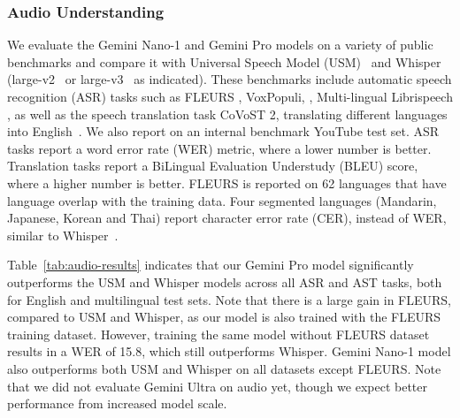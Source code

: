 \clearpage
\subsubsection{Audio Understanding}
\label{sec:audio}
We evaluate the Gemini Nano-1 and Gemini Pro models on a variety of public benchmarks and compare it with Universal Speech Model (USM)~\cite{usm} and Whisper (large-v2~\cite{whisper} or large-v3~\cite{whisper-v3} as indicated). These benchmarks include automatic speech recognition (ASR) tasks such as FLEURS \cite{conneau2023fleurs}, VoxPopuli, \cite{wang2021voxpopuli}, Multi-lingual Librispeech \cite{pratap2020mls}, as well as the speech translation task CoVoST 2, translating different languages into English~\cite{wang2020covost}. We also report on an internal benchmark YouTube test set. ASR tasks report a word error rate (WER) metric, where a lower number is better. Translation tasks report a BiLingual Evaluation Understudy (BLEU) score, where a higher number is better. FLEURS is reported on 62 languages that have language overlap with the training data. Four segmented languages (Mandarin, Japanese, Korean and Thai) report character error rate (CER), instead of WER, similar to Whisper~\cite{whisper}.

Table~\ref{tab:audio-results} indicates that our Gemini Pro model significantly outperforms the USM and Whisper models across all ASR and AST tasks, both for English and multilingual test sets. Note that there is a large gain in FLEURS, compared to USM and Whisper, as our model is also trained with the FLEURS training dataset. However, training the same model without FLEURS dataset results in a WER of 15.8, which still outperforms Whisper. Gemini Nano-1 model also outperforms both USM and Whisper on all datasets except FLEURS. Note that we did not evaluate Gemini Ultra on audio yet, though we expect better performance from increased model scale.


